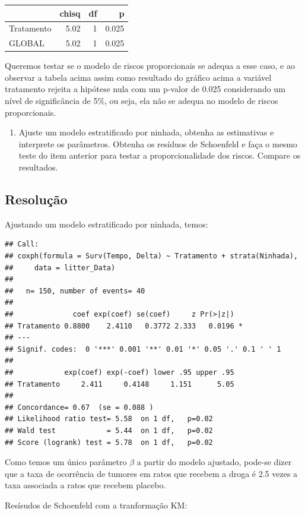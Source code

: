 \documentclass[]{article}
\providecommand{\tightlist}{%
  \setlength{\itemsep}{0pt}\setlength{\parskip}{0pt}}
\begin{document}
\begin{longtable}[]{@{}lrrr@{}}
\toprule
& chisq & df & p\tabularnewline
\midrule
\endhead
Tratamento & 5.02 & 1 & 0.025\tabularnewline
GLOBAL & 5.02 & 1 & 0.025\tabularnewline
\bottomrule
\end{longtable}

Queremos testar se o modelo de riscos proporcionais se adequa a esse
caso, e ao observar a tabela acima assim como resultado do gráfico acima
a variável tratamento rejeita a hipótese nula com um p-valor de 0.025
considerando um nível de significância de 5\%, ou seja, ela não se
adequa no modelo de riscos proporcionais.

\begin{enumerate}
\def\labelenumi{(\alph{enumi})}
\setcounter{enumi}{2}
\tightlist
\item
  Ajuste um modelo estratificado por ninhada, obtenha as estimativas e
  interprete os parâmetros. Obtenha os resíduos de Schoenfeld e faça o
  mesmo teste do item anterior para testar a proporcionalidade dos
  riscos. Compare os resultados.
\end{enumerate}

\subsection{Resolução}\label{resolucao-5}

Ajustando um modelo estratificado por ninhada, temos:

\begin{verbatim}
## Call:
## coxph(formula = Surv(Tempo, Delta) ~ Tratamento + strata(Ninhada), 
##     data = litter_Data)
## 
##   n= 150, number of events= 40 
## 
##              coef exp(coef) se(coef)     z Pr(>|z|)  
## Tratamento 0.8800    2.4110   0.3772 2.333   0.0196 *
## ---
## Signif. codes:  0 '***' 0.001 '**' 0.01 '*' 0.05 '.' 0.1 ' ' 1
## 
##            exp(coef) exp(-coef) lower .95 upper .95
## Tratamento     2.411     0.4148     1.151      5.05
## 
## Concordance= 0.67  (se = 0.088 )
## Likelihood ratio test= 5.58  on 1 df,   p=0.02
## Wald test            = 5.44  on 1 df,   p=0.02
## Score (logrank) test = 5.78  on 1 df,   p=0.02
\end{verbatim}

Como temos um único parâmetro \(\beta\) a partir do modelo ajustado,
pode-se dizer que a taxa de ocorrência de tumores em ratos que recebem a
droga é 2.5 vezes a taxa associada a ratos que recebem placebo.

Resísudos de Schoenfeld com a tranformação KM:
\end{document}
